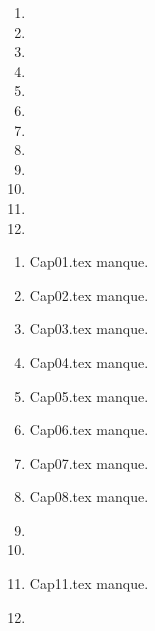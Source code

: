  
 
\begin{enumerate}
  \item  
  \item  
  \item  
  \item  
  \item  
  \item  
  \item  
  \item  
  \item  
  \item  
  \item  
  \item  
\end{enumerate} 
\clearpage 
{}
\begin{enumerate}
  \item Cap01.tex manque. 
  \item Cap02.tex manque. 
  \item Cap03.tex manque. 
  \item Cap04.tex manque. 
  \item Cap05.tex manque. 
  \item Cap06.tex manque. 
  \item Cap07.tex manque. 
  \item Cap08.tex manque. 
  \item  
  \item  
  \item Cap11.tex manque. 
  \item  
\end{enumerate} 
